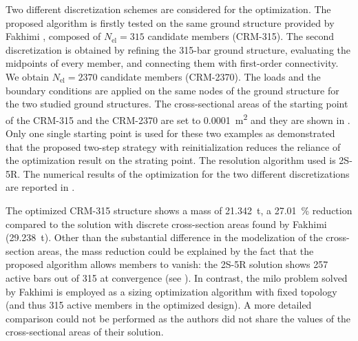     Two different discretization schemes are considered for the optimization. The proposed algorithm is firstly tested on the same ground structure provided by Fakhimi \etal {}, composed of $N_{\text{el}}=315$ candidate members (CRM-315). The second discretization is obtained by refining the 315-bar ground structure, evaluating the midpoints of every member, and connecting them with first-order connectivity. We obtain $N_{\text{el}}=2370$ candidate members (CRM-2370). The loads and the boundary conditions are applied on the same nodes of the ground structure for the two studied ground structures. The cross-sectional areas of the starting point of the CRM-315 and the CRM-2370 are set to \qty{0.0001}{m^2} and they are shown in . Only one single starting point is used for these two examples as  demonstrated that the proposed two-step strategy with reinitialization reduces the reliance of the optimization result on the strating point. The resolution algorithm used is 2S-5R. The numerical results of the optimization for the two different discretizations are reported in . 
    
    The optimized CRM-315 structure shows a mass of \qty{21.342}{\tonne}, a \qty{27.01}{\%} reduction compared to the solution with discrete cross-section areas found by Fakhimi \etal {} (\qty{29.238}{\tonne}). Other than the substantial difference in the modelization of the cross-section areas, the mass reduction could be explained by the fact that the proposed algorithm allows members to vanish: the 2S-5R solution shows 257 active bars out of 315 at convergence (see ). In contrast, the \gls{milo} problem solved by Fakhimi \etal \cite{fakhimi_discrete_2021} is employed as a sizing optimization algorithm with fixed topology (and thus 315 active members in the optimized design). A more detailed comparison could not be performed as the authors did not share the values of the cross-sectional areas of their solution. 
    
